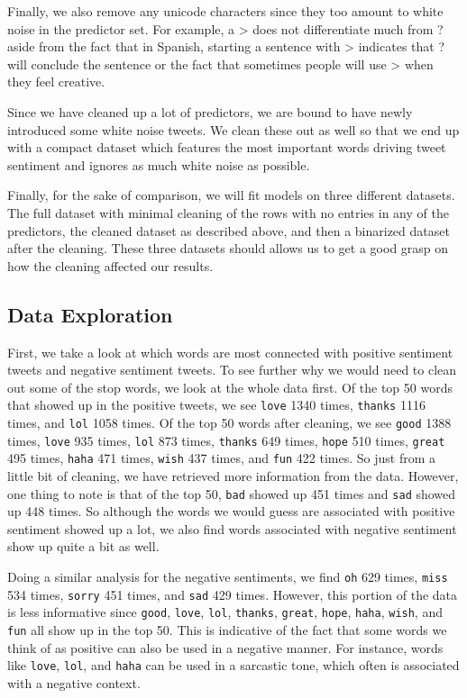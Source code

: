 \documentclass{article}
\begin{document}
Finally, we also remove any unicode characters since they too amount to white noise in the predictor set. For example, a > does not differentiate much from ? aside from the fact that in Spanish, starting a sentence with > indicates that ? will conclude the sentence or the fact that sometimes people will use > when they feel creative. 

Since we have cleaned up a lot of predictors, we are bound to have newly introduced some white noise tweets. We clean these out as well so that we end up with a compact dataset which features the most important words driving tweet sentiment and ignores as much white noise as possible.

Finally, for the sake of comparison, we will fit models on three different datasets. The full dataset with minimal cleaning of the rows with no entries in any of the predictors, the cleaned dataset as described above, and then a binarized dataset after the cleaning. These three datasets should allows us to get a good grasp on how the cleaning affected our results.

\subsection{Data Exploration}
First, we take a look at which words are most connected with positive sentiment tweets and negative sentiment tweets. To see further why we would need to clean out some of the stop words, we look at the whole data first. Of the top 50 words that showed up in the positive tweets, we see \texttt{love} 1340 times, \texttt{thanks} 1116 times, and \texttt{lol} 1058 times. Of the top 50 words after cleaning, we see \texttt{good} 1388 times, \texttt{love} 935 times, \texttt{lol} 873 times, \texttt{thanks} 649 times, \texttt{hope} 510 times, \texttt{great} 495 times, \texttt{haha} 471 times, \texttt{wish} 437 times, and \texttt{fun} 422 times. So just from a little bit of cleaning, we have retrieved more information from the data. However, one thing to note is that of the top 50, \texttt{bad} showed up 451 times and \texttt{sad} showed up 448 times. So although the words we would guess are associated with positive sentiment showed up a lot, we also find words associated with negative sentiment show up quite a bit as well.

Doing a similar analysis for the negative sentiments, we find \texttt{oh} 629 times, \texttt{miss} 534 times, \texttt{sorry} 451 times, and \texttt{sad} 429 times. However, this portion of the data is less informative since \texttt{good}, \texttt{love}, \texttt{lol}, \texttt{thanks}, \texttt{great}, \texttt{hope}, \texttt{haha}, \texttt{wish}, and \texttt{fun} all show up in the top 50. This is indicative of the fact that some words we think of as positive can also be used in a negative manner. For instance, words like \texttt{love}, \texttt{lol}, and \texttt{haha} can be used in a sarcastic tone, which often is associated with a negative context.
\end{document}
